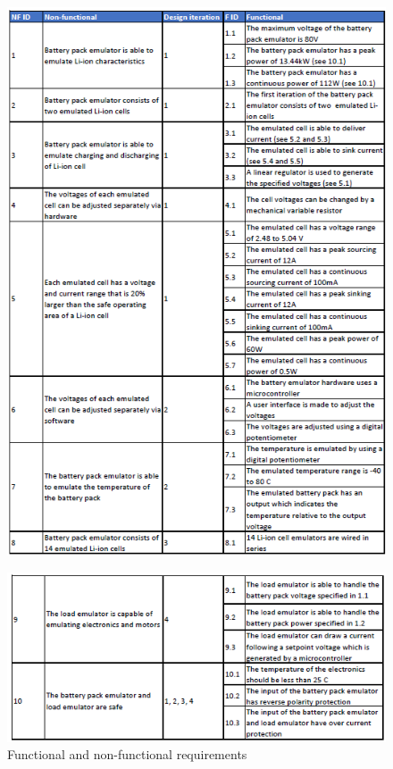 \begin{figure}[ht!]
    \centering
    \includegraphics[width=.8\textwidth]{images/Functional_non-functional_requirements_p1.png}
\end{figure}
\newpage

\begin{figure}[ht!]
    \centering
    \includegraphics[width=.8\textwidth]{images/Functional_non-functional_requirements_p2.png}
    \caption{Functional and non-functional requirements}
    \label{fig:functional_and_non-functional_requirements}
\end{figure}